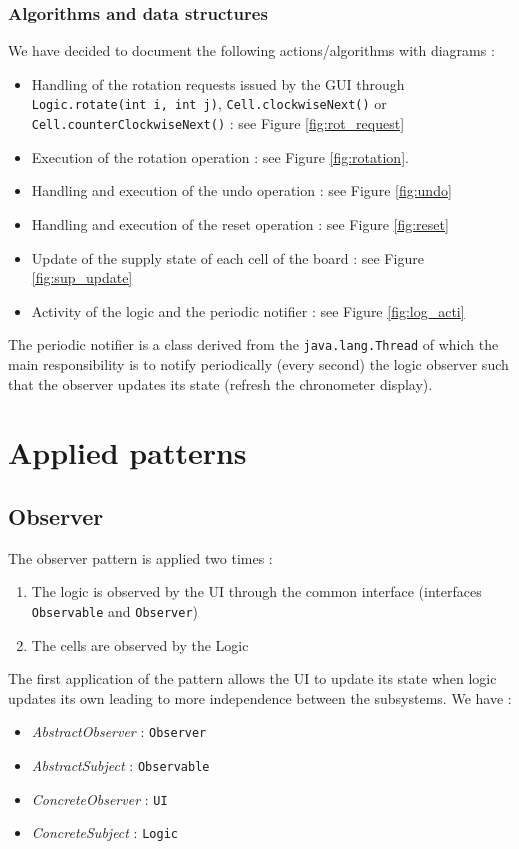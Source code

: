 \documentclass[a4paper,11pt]{article}
\begin{document}
\subsubsection{Algorithms and data structures}
We have decided to document the following actions/algorithms with diagrams :
\begin{itemize}
	\item Handling of the rotation requests issued by the GUI through \texttt{Logic.rotate(int i, int j)}, \texttt{Cell.clockwiseNext()} or \texttt{Cell.counterClockwiseNext()} : see Figure \ref{fig:rot_request}
	\item Execution of the rotation operation : see Figure \ref{fig:rotation}.
	\item Handling and execution of the undo operation  : see Figure \ref{fig:undo}
	\item Handling and execution of the reset operation : see Figure \ref{fig:reset}
	\item Update of the supply state of each cell of the board : see Figure \ref{fig:sup_update}
	\item Activity of the logic and the periodic notifier : see Figure \ref{fig:log_acti}
\end{itemize}
The periodic notifier is a class derived from the \texttt{java.lang.Thread} of which the main responsibility is to notify periodically (every second) the logic observer such that the observer updates its state (refresh the chronometer display).
\section{Applied patterns}
\label{sec:patterns}
\subsection{Observer}
The observer pattern is applied two times : 
\begin{enumerate}
	\item The logic is observed by the UI through the common interface (interfaces \texttt{Observable} and \texttt{Observer})
	\item The cells are observed by the Logic
\end{enumerate}
The first application of the pattern allows the UI to update its state when logic updates its own leading to more independence between the subsystems. We have : 
\begin{itemize}
	\item \textit{AbstractObserver} : \texttt{Observer}
	\item \textit{AbstractSubject} : \texttt{Observable}
	\item \textit{ConcreteObserver} : \texttt{UI}
	\item \textit{ConcreteSubject} : \texttt{Logic}
\end{itemize}
\end{document}
